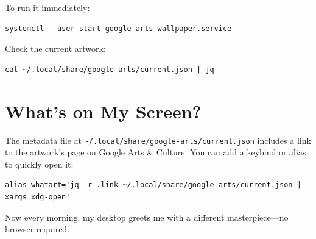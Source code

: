 \documentclass{article}
\begin{document}
To run it immediately:

\begin{verbatim}
systemctl --user start google-arts-wallpaper.service
\end{verbatim}

Check the current artwork:

\begin{verbatim}
cat ~/.local/share/google-arts/current.json | jq
\end{verbatim}

\section{What's on My Screen?}

The metadata file at \texttt{\textasciitilde{}/.local/share/google-arts/current.json} includes a link to the artwork's page on Google Arts \& Culture. You can add a keybind or alias to quickly open it:

\begin{verbatim}
alias whatart='jq -r .link ~/.local/share/google-arts/current.json | xargs xdg-open'
\end{verbatim}

Now every morning, my desktop greets me with a different masterpiece---no browser required.


\end{document}
